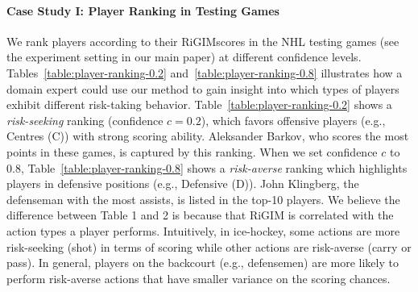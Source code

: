 \documentclass{article}
\newcommand{\confidence}{c}
\newcommand{\sys}{RiGIM}
\newcommand{\system}{\sys\;}
\begin{document}
\paragraph{Case Study I: Player Ranking in Testing Games}
We rank players according to their \system scores in the NHL testing games (see the experiment setting in our main paper) at different confidence levels. 
Tables~\ref{table:player-ranking-0.2} and~\ref{table:player-ranking-0.8} illustrates how a domain expert could use our method to gain insight into which types of players exhibit different risk-taking behavior.
Table~\ref{table:player-ranking-0.2} shows a {\it risk-seeking} ranking (confidence $\confidence=0.2$),  which favors offensive players (e.g., Centres (C)) with strong scoring ability. Aleksander Barkov, who scores the most points in these games, is captured by this ranking. When we set confidence $\confidence$ to 0.8, Table~\ref{table:player-ranking-0.8} shows a {\it risk-averse} ranking which highlights players in defensive positions (e.g., Defensive (D)). John Klingberg, the defenseman with the most assists, is listed in the top-10 players. 
We believe the difference between Table 1 and 2 is because that RiGIM is correlated with the action types a player performs. Intuitively, in ice-hockey, some actions are more risk-seeking (shot) in terms of scoring while other actions are risk-averse (carry or pass). In general, players on the backcourt (e.g., defensemen) are more likely to perform risk-averse actions that have smaller variance on the scoring chances.
\end{document}
